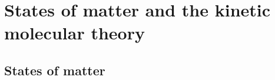          \chapter{States of matter and the kinetic molecular theory}
    \setcounter{figure}{1}
    \setcounter{subfigure}{1}
\label{m38736*cid2}
            \section{States of matter}
            \nopagebreak

